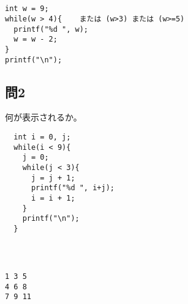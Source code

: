 \documentclass[a4j]{jarticle}
\begin{document}
\begin{multicols*}{2}
\ifnum {}
\begin{verbatim}






\end{verbatim}
\else
\begin{verbatim}
int w = 9;
while(w > 4){    または (w>3) または (w>=5)
  printf("%d ", w);
  w = w - 2;
}
printf("\n");
\end{verbatim}
\fi
\vspace*{7cm}




\subsection*{問2}


何が表示されるか。



\begin{verbatim}
  int i = 0, j;
  while(i < 9){
    j = 0;
    while(j < 3){
      j = j + 1;
      printf("%d ", i+j);
      i = i + 1;
    }
    printf("\n");
  }
\end{verbatim}


\ifnum {}
\begin{verbatim}



\end{verbatim}
\else
\begin{verbatim}
1 3 5
4 6 8
7 9 11
\end{verbatim}
\fi






%









\end{multicols*}
\end{document}

